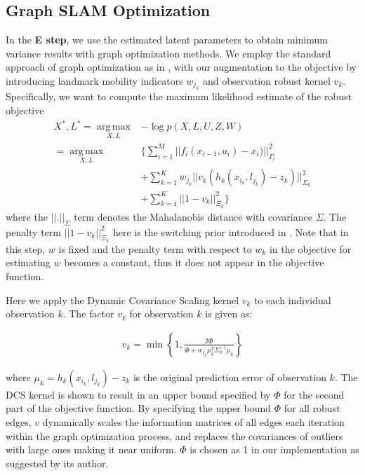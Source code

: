 \subsection{Graph SLAM Optimization}

In the \textbf{E step}, we use the estimated latent parameters to obtain minimum variance results with graph optimization methods. We employ the standard approach of graph optimization as in \cite{g2o}, with our augmentation to the objective by introducing landmark mobility indicators $w_{j_k}$ and observation robust kernel $v_k$. Specifically, we want to compute the maximum likelihood estimate of the robust objective
\begin{equation}
\begin{aligned}
X^*, L^* = \operatorname*{arg\,max}_{X, L} & -\log p(X, L, U, Z, W)\\
=\operatorname*{arg\,max}_{X, L} & \{ \sum_{i=1}^M||f_i(x_{i-1}, u_i) - x_i)||^2_{\Gamma_i} \\
&+ \sum_{k=1}^K w_{j_k}|| v_k (h_k(x_{i_k}, l_{j_k}) - z_k)||^2_{\Sigma_k} \\ 
&+ \sum_{k=1}^K ||1 - v_k||^2_{\Xi_k} \}
\end{aligned}
\label{eq:MAP}
\end{equation}
where the $||.||_\Sigma$ term denotes the Mahalanobis distance with covariance $\Sigma$. The penalty term $|| 1 - v_k||^2_{\Xi_k}$ here is the switching prior introduced in \cite{Switchable12}. Note that in this step, $w$ is fixed and the penalty term with respect to $w_k$ in the objective for estimating $w$ becomes a constant, thus it does not appear in the objective function.

Here we apply the Dynamic Covariance Scaling\cite{DCS} kernel $v_k$ to each individual observation $k$. The factor $v_k$ for observation $k$ is given as:

\begin{equation}
\begin{aligned}
v_k = \min \left\{ 1, \frac{2\Phi}{\Phi + w_{j_k}\mu_k^T \Sigma_k^{-1} \mu_k}\right\}
\end{aligned}
\label{eq:DCS}
\end{equation}

where $\mu_k = h_k(x_{i_k}, l_{j_k}) - z_k$ is the original prediction error of observation $k$. The DCS kernel is shown to result in an upper bound specified by $\Phi$ for the second part of the objective function. By specifying the upper bound $\Phi$ for all robust edges, $v$ dynamically scales the information matrices of all edges each iteration within the graph optimization process, and replaces the covariances of outliers with large ones making it near uniform. $\Phi$ is chosen as 1 in our implementation as suggested by its author. 

